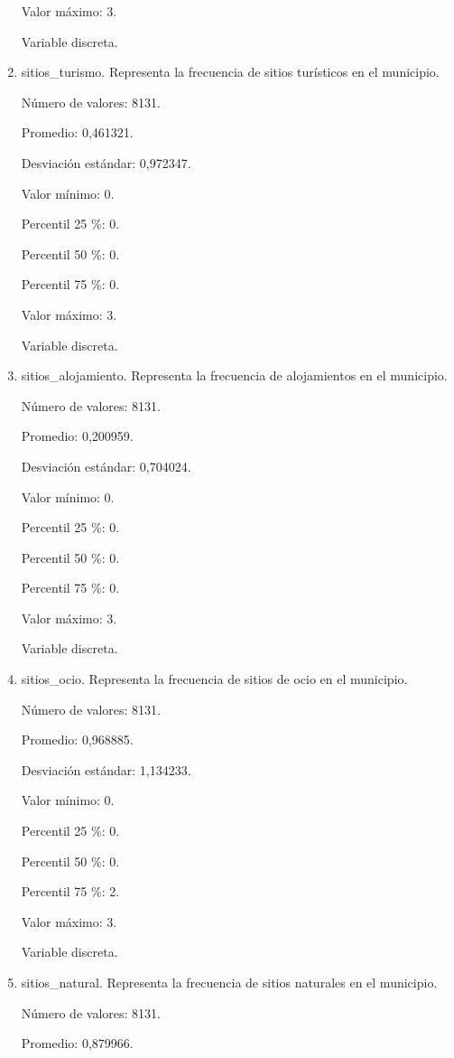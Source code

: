 \begin{enumerate}
	Valor máximo: 3.
	
	Variable discreta.

	\item sitios\_turismo. Representa la frecuencia de sitios turísticos en el municipio.
	
	Número de valores: 8131.
	
	Promedio: 0,461321.
	
	Desviación estándar: 0,972347.
	
	Valor mínimo: 0.
	
	Percentil 25 \%: 0.
	
	Percentil 50 \%: 0.
	
	Percentil 75 \%: 0.
	
	Valor máximo: 3.
	
	Variable discreta.

	\item sitios\_alojamiento. Representa la frecuencia de alojamientos en el municipio.
	
	Número de valores: 8131.
	
	Promedio: 0,200959.
	
	Desviación estándar: 0,704024.
	
	Valor mínimo: 0.
	
	Percentil 25 \%: 0.
	
	Percentil 50 \%: 0.
	
	Percentil 75 \%: 0.
	
	Valor máximo: 3.
	
	Variable discreta.

	\item sitios\_ocio. Representa la frecuencia de sitios de ocio en el municipio.
	
	Número de valores: 8131.
	
	Promedio: 0,968885.
	
	Desviación estándar: 1,134233.
	
	Valor mínimo: 0.
	
	Percentil 25 \%: 0.
	
	Percentil 50 \%: 0.
	
	Percentil 75 \%: 2.
	
	Valor máximo: 3.
	
	Variable discreta.

	\item sitios\_natural. Representa la frecuencia de sitios naturales en el municipio.
	
	Número de valores: 8131.
	
	Promedio: 0,879966.
	

\end{enumerate}
